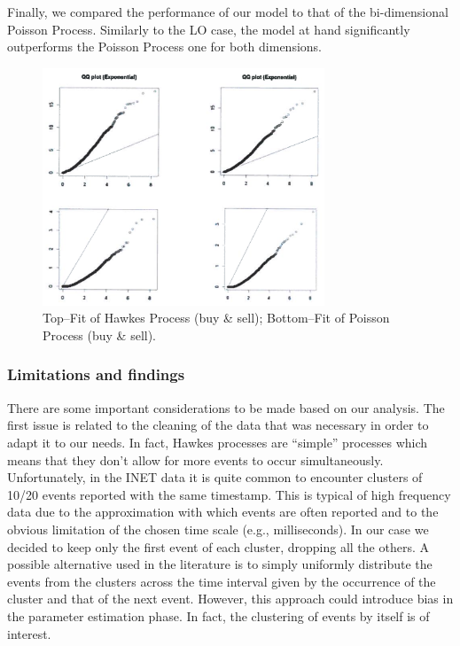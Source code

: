 Finally, we compared the performance of our model to that of the bi-dimensional Poisson Process. Similarly to the LO case, the model at hand significantly outperforms the Poisson Process one for both dimensions. 
	\begin{figure}[!ht]
   	\centering
   	\includegraphics[width=0.75\textwidth]{chapters/chapter_trade_data_models/figures/4fig.png} 
   	\caption{Top--Fit of Hawkes Process (buy \& sell); Bottom--Fit of Poisson Process (buy \& sell). \label{fig:4fig6}}
	\end{figure}


\subsubsection{Limitations and findings}


There are some important considerations to be made based on our analysis. The first issue is related to the cleaning of the data that was necessary in order to adapt it to our needs. In fact, Hawkes processes are ``simple'' processes which means that they don't allow for more events to occur simultaneously. Unfortunately, in the INET data it is quite common to encounter clusters of 10/20 events reported with the same timestamp. This is typical of high frequency data due to the approximation with which events are often reported and to the obvious limitation of the chosen time scale (e.g., milliseconds). In our case we decided to keep only the first event of each cluster, dropping all the others. A possible alternative used in the literature is to simply uniformly distribute the events from the clusters across the time interval given by the occurrence of the cluster and that of the next event. However, this approach could introduce bias in the parameter estimation phase. In fact, the clustering of events by itself is of interest.


